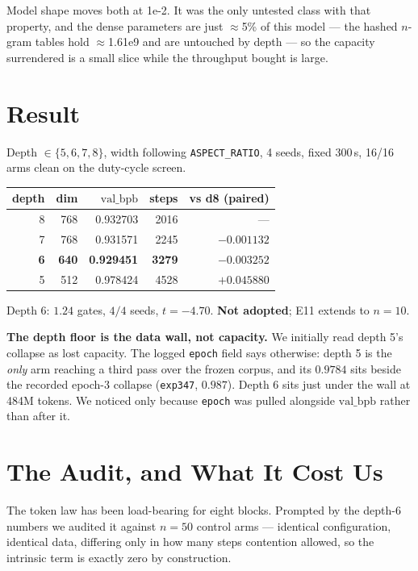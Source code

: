 \documentclass{article}
\newcommand{\vb}{\mathrm{val\_bpb}}
\begin{document}
Model shape moves both at 1e-2. It was the only untested class with that property, and the dense parameters are just $\approx$5\% of this model --- the hashed $n$-gram tables hold $\approx$1.61e9 and are untouched by depth --- so the capacity surrendered is a small slice while the throughput bought is large.

\section{Result}
Depth $\in\{5,6,7,8\}$, width following \texttt{ASPECT\_RATIO}, 4 seeds, fixed 300\,s, 16/16 arms clean on the duty-cycle screen.

\begin{center}\begin{small}
\begin{tabular}{rrrrr}
\toprule
depth & dim & $\vb$ & steps & vs d8 (paired) \\
\midrule
8 & 768 & 0.932703 & 2016 & --- \\
7 & 768 & 0.931571 & 2245 & $-0.001132$ \\
\textbf{6} & \textbf{640} & \textbf{0.929451} & \textbf{3279} & $\mathbf{-0.003252}$ \\
5 & 512 & 0.978424 & 4528 & $+0.045880$ \\
\bottomrule
\end{tabular}
\end{small}\end{center}

Depth 6: $1.24$ gates, $4/4$ seeds, $t = -4.70$. \textbf{Not adopted}; E11 extends to $n{=}10$.

\textbf{The depth floor is the data wall, not capacity.} We initially read depth 5's collapse as lost capacity. The logged \texttt{epoch} field says otherwise: depth 5 is the \emph{only} arm reaching a third pass over the frozen corpus, and its $0.9784$ sits beside the recorded epoch-3 collapse (\texttt{exp347}, $0.987$). Depth 6 sits just under the wall at 484M tokens. We noticed only because \texttt{epoch} was pulled alongside $\vb$ rather than after it.

\section{The Audit, and What It Cost Us}
The token law has been load-bearing for eight blocks. Prompted by the depth-6 numbers we audited it against $n{=}50$ control arms --- identical configuration, identical data, differing only in how many steps contention allowed, so the intrinsic term is exactly zero by construction.
\end{document}
